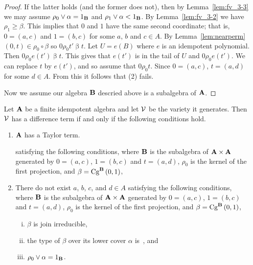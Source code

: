 \begin{proof}
If the latter holds (and the former does not), then
by Lemma~\ref{lem:fv_3-3} we may 
assume $\rho_0 \join \alpha = 1_{\alg B}$ and
$\rho_1 \join \alpha < 1_{\alg B}$. By Lemma~\ref{lem:fv_3-2}
we have $\rho_1 \ge \beta$.
This implies that $0$ and $1$ have the same second coordinate; that is,
$0 = (a,c)$ and $1 = (b,c)$ for some $a$, $b$ and $c\in A$.
By Lemma~\ref{lem:nearperm} $(0,t) \in \rho_0 \circ \beta$
so $0 \mathrel {\rho_0} t' \mathrel{\beta} t$. Let $U = e(B)$
where $e$ is an idempotent polynomial. Then
$0 \mathrel {\rho_0} e(t') \mathrel{\beta} t$. This gives
that $e(t')$ is in the tail of $U$ and 
$0 \mathrel{\rho_0} e(t')$. We can
replace $t$ by $e(t')$, and so assume that 
$0 \mathrel{\rho_0} t$.
Since $0 = (a,c)$, $t = (a,d)$ for some $d\in A$. From this
it follows that (2) fails.

Now we assume our algebra $\alg B$ descried above is a subalgebra
of $\alg A$. 



\end{proof}



\begin{theorem}
Let $\alg A$ be a finite idempotent algebra and let $\sV$ be the variety 
it generates. Then $\sV$ has a difference term if and only if the
following conditions hold.
\begin{enumerate}
\item $\alg A$ has a Taylor term.





satisfying
the following conditions, where 
$\alg B$ is the subalgebra of 
$\alg A \times \alg A$ generated by $0 = (a, c)$, $1 = (b,c)$ 
and $t = (a,d)$, $\rho_0$ is the kernel of the first projection,
and $\beta = \Cga01{B}$,



\item There do not exist $a$, $b$, $c$, and $d\in A$ satisfying
the following conditions, where 
$\alg B$ is the subalgebra of 
$\alg A \times \alg A$ generated by $0 = (a, c)$, $1 = (b,c)$ 
and $t = (a,d)$, $\rho_0$ is the kernel of the first projection,
and $\beta = \Cga01{B}$,
\begin{enumerate}[(i)]
\item $\beta$ is join irreducible,
\item the type of $\beta$ over its lower cover $\alpha$ is~\atyp, and
\item 
$\rho_0 \join \alpha = 1_{\alg B}$.
\end{enumerate}
\end{enumerate}
\end{theorem}

